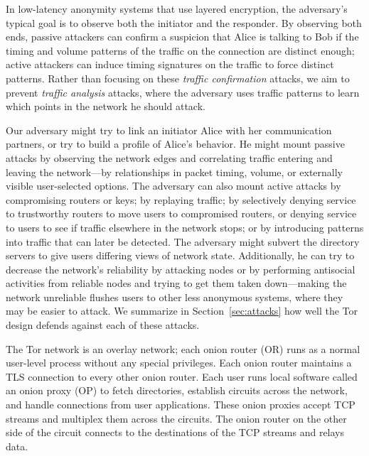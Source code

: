 \documentclass[times,10pt,twocolumn]{article}
\begin{document}
In low-latency anonymity systems that use layered encryption, the
adversary's typical goal is to observe both the initiator and the
responder. By observing both ends, passive attackers can confirm a
suspicion that Alice is
talking to Bob if the timing and volume patterns of the traffic on the
connection are distinct enough; active attackers can induce timing
signatures on the traffic to force distinct patterns. Rather
than focusing on these \emph{traffic confirmation} attacks,
we aim to prevent \emph{traffic
analysis} attacks, where the adversary uses traffic patterns to learn
which points in the network he should attack.

Our adversary might try to link an initiator Alice with her
communication partners, or try to build a profile of Alice's
behavior. He might mount passive attacks by observing the network edges
and correlating traffic entering and leaving the network---by
relationships in packet timing, volume, or externally visible
user-selected
options. The adversary can also mount active attacks by compromising
routers or keys; by replaying traffic; by selectively denying service
to trustworthy routers to move users to
compromised routers, or denying service to users to see if traffic
elsewhere in the
network stops; or by introducing patterns into traffic that can later be
detected. The adversary might subvert the directory servers to give users
differing views of network state. Additionally, he can try to decrease
the network's reliability by attacking nodes or by performing antisocial
activities from reliable nodes and trying to get them taken down---making
the network unreliable flushes users to other less anonymous
systems, where they may be easier to attack. We summarize
in Section~\ref{sec:attacks} how well the Tor design defends against
each of these attacks.


\label{sec:design}

The Tor network is an overlay network; each onion router (OR)
runs as a normal
user-level process without any special privileges.
Each onion router maintains a TLS \cite{TLS}
connection to every other onion router.
Each user
runs local software called an onion proxy (OP) to fetch directories,
establish circuits across the network,
and handle connections from user applications.  These onion proxies accept
TCP streams and multiplex them across the circuits. The onion
router on the other side
of the circuit connects to the destinations of
the TCP streams and relays data.
\end{document}
